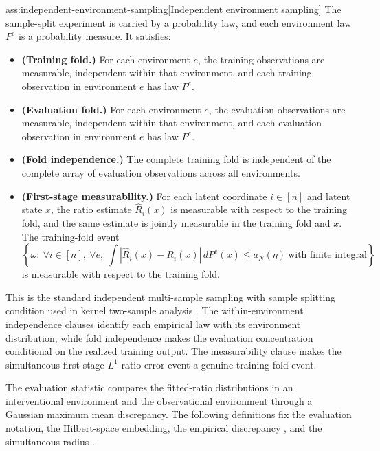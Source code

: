 \documentclass[11pt]{article}
\begin{document}
\begin{assumptionv}{ass:independent-environment-sampling}[Independent environment sampling]
The sample-split experiment is carried by a probability law, and each environment law \(P^e\) is a probability measure. It satisfies:
\begin{itemize}
\item \textbf{(Training fold.)} For each environment \(e\), the training observations are measurable, independent within that environment, and each training observation in environment \(e\) has law \(P^e\).
\item \textbf{(Evaluation fold.)} For each environment \(e\), the evaluation observations are measurable, independent within that environment, and each evaluation observation in environment \(e\) has law \(P^e\).
\item \textbf{(Fold independence.)} The complete training fold is independent of the complete array of evaluation observations across all environments.
\item \textbf{(First-stage measurability.)} For each latent coordinate \(i\in[n]\) and latent state \(x\), the ratio estimate \(\widehat R_i(x)\) is measurable with respect to the training fold, and the same estimate is jointly measurable in the training fold and \(x\). The training-fold event
\[
\left\{\omega:\ \forall i\in[n],\ \forall e,\ 
\int \left|\widehat R_i(x)-R_i(x)\right|\,dP^e(x)\le a_N(\eta)
\ \text{with finite integral}\right\}
\]
is measurable with respect to the training fold.
\end{itemize}
\end{assumptionv}

This is the standard independent multi-sample sampling with sample splitting condition used in kernel two-sample analysis \citep{GrettonEtAl2012KernelTwoSample}. The within-environment independence clauses identify each empirical law with its environment distribution, while fold independence makes the evaluation concentration conditional on the realized training output. The measurability clause makes the simultaneous first-stage \(L^1\) ratio-error event a genuine training-fold event.

The evaluation statistic compares the fitted-ratio distributions in an interventional environment and the observational environment through a Gaussian maximum mean discrepancy. The following definitions fix the evaluation notation, the Hilbert-space embedding, the empirical discrepancy , and the simultaneous radius .
\end{document}
